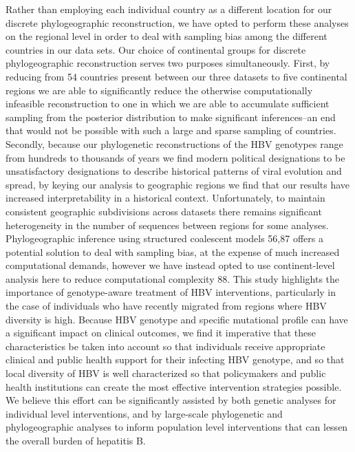 Rather than employing each individual country as a different location for our discrete phylogeographic reconstruction, we have opted to perform these analyses on the regional level in order to deal with sampling bias among the different countries in our data sets. Our choice of continental groups for discrete phylogeographic reconstruction serves two purposes simultaneously. First, by reducing from 54 countries present between our three datasets to five continental regions we are able to significantly reduce the otherwise computationally infeasible reconstruction to one in which we are able to accumulate sufficient sampling from the posterior distribution to make significant inferences–an end that would not be possible with such a large and sparse sampling of countries. Secondly, because our phylogenetic reconstructions of the HBV genotypes range from hundreds to thousands of years we find modern political designations to be unsatisfactory designations to describe historical patterns of viral evolution and spread, by keying our analysis to geographic regions we find that our results have increased interpretability in a historical context.   Unfortunately, to maintain consistent geographic subdivisions across datasets there remains significant heterogeneity in the number of sequences between regions for some analyses. Phylogeographic inference using structured coalescent models 56,87 offers a potential solution to deal with sampling bias, at the expense of much increased computational demands, however we have instead opted to use continent-level analysis here to reduce computational complexity  88.
This study highlights the importance of genotype-aware treatment of HBV interventions, particularly in the case of individuals who have recently migrated from regions where HBV diversity is high. Because HBV genotype and specific mutational profile can have a significant impact on clinical outcomes, we find it imperative that these characteristics be taken into account so that individuals receive appropriate clinical and public health support for their infecting HBV genotype, and so that local diversity of HBV is well characterized so that policymakers and public health institutions can create the most effective intervention strategies possible. We believe this effort can be significantly assisted by both genetic analyses for individual level interventions, and by large-scale phylogenetic and phylogeographic analyses to inform population level interventions that can lessen the overall burden of hepatitis B.

